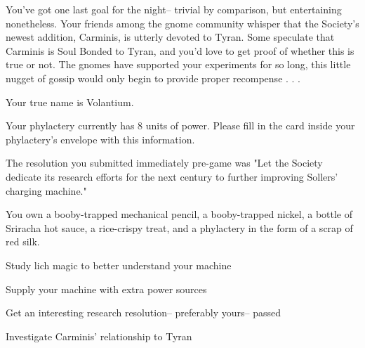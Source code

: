 \documentclass[char]{Sel}
\begin{document}
You've got one last goal for the night-- trivial by comparison, but entertaining nonetheless. Your friends among the gnome community whisper that the Society's newest addition, Carminis, is utterly devoted to Tyran. Some speculate that Carminis is Soul Bonded to Tyran, and you'd love to get proof of whether this is true or not. The gnomes have supported your experiments for so long, this little nugget of gossip would only begin to provide proper recompense . . .
\begin{itemz}[Notes]
  \item Your true name is Volantium.
      \item Your phylactery currently has 8 units of power. Please fill in the card inside your phylactery's envelope with this information.
  \item The resolution you submitted immediately pre-game was "Let the Society dedicate its research efforts for the next century to further improving Sollers' charging machine."
  \item You own a booby-trapped mechanical pencil, a booby-trapped nickel, a bottle of Sriracha hot sauce, a rice-crispy treat, and a phylactery in the form of a scrap of red silk.
    \end{itemz}


 \begin{itemz}[Goals]
 \item Study lich magic to better understand your machine
\item Supply your machine with extra power sources
\item Get an interesting research resolution-- preferably yours-- passed
\item Investigate Carminis' relationship to Tyran
\end{itemz}
\end{document}
